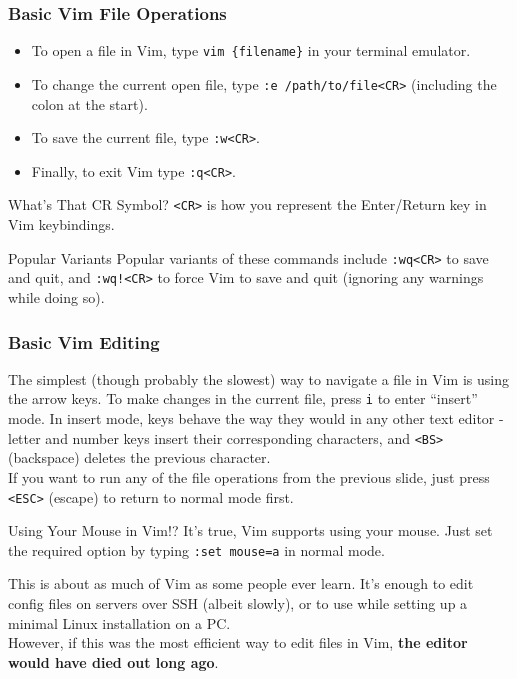 \documentclass{beamer}
\begin{document}
\begin{frame}[fragile]
    \frametitle{Basic Vim File Operations}
    \small
    \begin{itemize}
	\item To open a file in Vim, type \verb+vim {filename}+ in your terminal emulator.
	\item To change the current open file, type \verb+:e /path/to/file<CR>+ (including the colon at the start).
	\item To save the current file, type \verb+:w<CR>+.
	\item Finally, to exit Vim type \verb+:q<CR>+.
    \end{itemize}
    \begin{block}{What's That CR Symbol?}
	\verb+<CR>+ is how you represent the Enter/Return key in Vim keybindings.
    \end{block}
    \begin{block}{Popular Variants}
	Popular variants of these commands include \verb+:wq<CR>+ to save and quit, and \verb+:wq!<CR>+ to force Vim to save and quit (ignoring any warnings while doing so).
    \end{block}
\end{frame}

\begin{frame}[fragile]
    \frametitle{Basic Vim Editing}
    \small
    The simplest (though probably the slowest) way to navigate a file in Vim is using the arrow keys. To make changes in the current file, press \verb+i+ to enter \enquote{insert} mode. In insert mode, keys behave the way they would in any other text editor - letter and number keys insert their corresponding characters, and \verb+<BS>+ (backspace) deletes the previous character. \\
    \vspace{0.5cm}
    If you want to run any of the file operations from the previous slide, just press \verb+<ESC>+ (escape) to return to normal mode first.
    \begin{block}{Using Your Mouse in Vim!?}
	It's true, Vim supports using your mouse. Just set the required option by typing \verb+:set mouse=a+ in normal mode.
    \end{block}
\end{frame}

\begin{frame}[fragile]
    \small This is about as much of Vim as some people ever learn. It's enough to edit config files on servers over SSH (albeit slowly), or to use while setting up a minimal Linux installation on a PC. \\
    \vspace{0.5cm}
    However, if this was the most efficient way to edit files in Vim, \textbf{the editor would have died out long ago}.
\end{frame}
\end{document}
